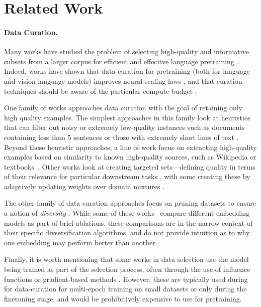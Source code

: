 \section{Related Work}
\paragraph{Data Curation.} Many works have studied the problem of selecting high-quality and informative subsets from a larger corpus for efficient and effective language pretraining~\citep{Albalak2024ASO}. Indeed, works have shown that data curation for pretraining (both for language and vision-language models) improves neural scaling laws \citep{sorscher2022beyond}, and that curation techniques should be aware of the particular compute budget \citep{goyal2024scaling}.

One family of works approaches data curation with the goal of retaining only high quality examples. The simplest approaches in this family look at heuristics that can filter out noisy or extremely low-quality instances such as documents containing less than 5 sentences or those with extremely short lines of text \citep{raffel2020exploring, xue2020mt5}. Beyond these heuristic approaches, a line of work focus on extracting high-quality examples based on similarity to known high-quality sources, such as Wikipedia or textbooks~\citep{gunasekar2023textbooks, penedo2024fineweb}. 
Other works look at creating targeted sets---defining quality in terms of their relevance for particular downstream tasks \citep{xie2023data}, with some creating these by adaptively updating weights over domain mixtures \citep{xie2024doremi, jiang2024adaptive}. 

The other family of data curation approaches focus on pruning datasets to ensure a notion of \textit{diversity} \citep{abbas2023semdedup, abbas2024effective, tirumala2023d4}. While some of these works~\citep{abbas2024effective, tirumala2023d4} compare different embedding models as part of brief ablations, these comparisons are in the narrow context of their specific divsersification algorithms, and do not provide intuition as to why one embedding may perform better than another. 

Finally, it is worth mentioning that some works in data selection use the model being trained as part of the selection process, often through the use of influence functions or gradient-based methods \citep{garima2020estimating, xia2024less, engstrom2024dsdm}. 
However, these are typically used during for data-curation for multi-epoch training on small datasets or only during the finetuning stage, and would be prohibitively expensive to use for pretraining.


